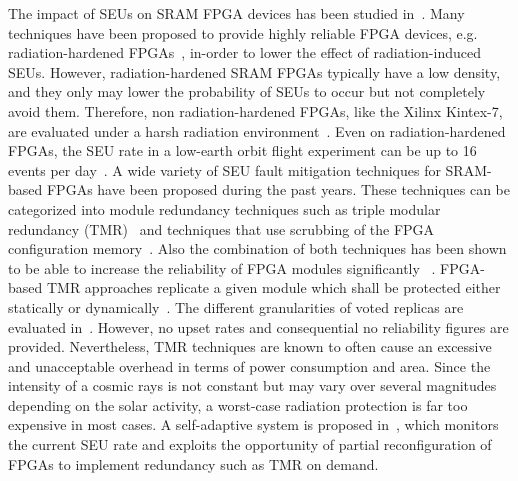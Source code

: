 The impact of SEUs on SRAM FPGA devices has been studied in~\cite{bellato2004evaluating}. Many  techniques  have  been  proposed to provide highly reliable FPGA devices, e.g. radiation-hardened FPGAs~\cite{rockett2007radiation}, in-order to lower the effect of radiation-induced SEUs. However, radiation-hardened  SRAM  FPGAs  typically have  a  low  density, and  they  only  may  lower  the  probability of SEUs to occur but  not  completely avoid  them. Therefore, non radiation-hardened FPGAs, like the  Xilinx Kintex-7, are evaluated under a harsh radiation  environment~\cite{wirthlin2014soft}. Even on radiation-hardened FPGAs, the SEU rate in a low-earth orbit flight experiment can be up to 16 events per day~\cite{quinn2012orbit}. A wide  variety  of  SEU  fault  mitigation  techniques  for SRAM-based  FPGAs  have  been  proposed  during  the  past years. These techniques can be categorized into module redundancy techniques such as triple modular redundancy (TMR)~\cite{lyons1962use} and techniques that use scrubbing of the FPGA configuration memory~\cite{heiner2009fpga}. Also the combination of  both techniques has been shown to be able to increase the reliability of FPGA modules significantly ~\cite{ostler2009sram}. FPGA-based TMR approaches replicate a given module which shall be protected either statically or dynamically~\cite{angermeier2011runtime}. The different granularities of voted replicas  are evaluated in~\cite{bolchini2007tmr}. However, no upset rates and consequential no reliability figures are provided. Nevertheless, TMR techniques are  known to often cause an excessive and unacceptable overhead in terms of power  consumption and area. Since the intensity of a cosmic rays is not constant but may vary over several magnitudes depending on the solar activity, a worst-case radiation protection is far too expensive in most cases. A self-adaptive system is proposed in~\cite{glein2014self}, which monitors the current SEU rate and exploits the opportunity of partial reconfiguration of FPGAs to implement redundancy such as TMR on demand. 

